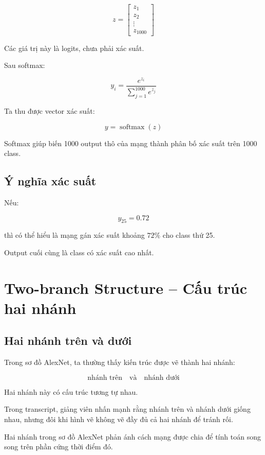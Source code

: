 \[
    z =
    \begin{bmatrix}
    z_1\\
    z_2\\
    \vdots\\
    z_{1000}
    \end{bmatrix}
\]

Các giá trị này là logits, chưa phải xác suất.

Sau softmax:

\[
    y_i =
    \frac{e^{z_i}}
    {\sum_{j=1}^{1000}e^{z_j}}
\]

Ta thu được vector xác suất:

\[
    y =
    \operatorname{softmax}(z)
\]

\begin{ghinho}
Softmax giúp biến 1000 output thô của mạng thành phân bố xác suất trên 1000 class.
\end{ghinho}

\subsection{Ý nghĩa xác suất}

Nếu:

\[
    y_{25}=0.72
\]

thì có thể hiểu là mạng gán xác suất khoảng $72\%$ cho class thứ 25.

Output cuối cùng là class có xác suất cao nhất.

\section{Two-branch Structure -- Cấu trúc hai nhánh}

\subsection{Hai nhánh trên và dưới}

Trong sơ đồ AlexNet, ta thường thấy kiến trúc được vẽ thành hai nhánh:

\[
    \text{nhánh trên}
    \quad \text{và} \quad
    \text{nhánh dưới}
\]

Hai nhánh này có cấu trúc tương tự nhau.

Trong transcript, giảng viên nhấn mạnh rằng nhánh trên và nhánh dưới giống nhau, nhưng đôi khi hình vẽ không vẽ đầy đủ cả hai nhánh để tránh rối.

\begin{ghinho}
Hai nhánh trong sơ đồ AlexNet phản ánh cách mạng được chia để tính toán song song trên phần cứng thời điểm đó.
\end{ghinho}

